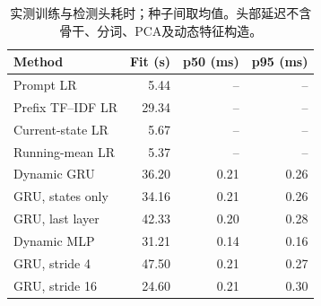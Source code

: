 \begin{table}[t]
\centering\footnotesize
\caption{实测训练与检测头耗时；种子间取均值。头部延迟不含骨干、分词、PCA及动态特征构造。}\label{tab:timing}
\begin{tabular}{lrrr}\toprule
Method & Fit (s) & p50 (ms) & p95 (ms) \\
\midrule
Prompt LR & 5.44 & -- & -- \\
Prefix TF--IDF LR & 29.34 & -- & -- \\
Current-state LR & 5.67 & -- & -- \\
Running-mean LR & 5.37 & -- & -- \\
Dynamic GRU & 36.20 & 0.21 & 0.26 \\
GRU, states only & 34.16 & 0.21 & 0.26 \\
GRU, last layer & 42.33 & 0.20 & 0.28 \\
Dynamic MLP & 31.21 & 0.14 & 0.16 \\
GRU, stride 4 & 47.50 & 0.21 & 0.27 \\
GRU, stride 16 & 24.60 & 0.21 & 0.30 \\
\bottomrule\end{tabular}
\end{table}
